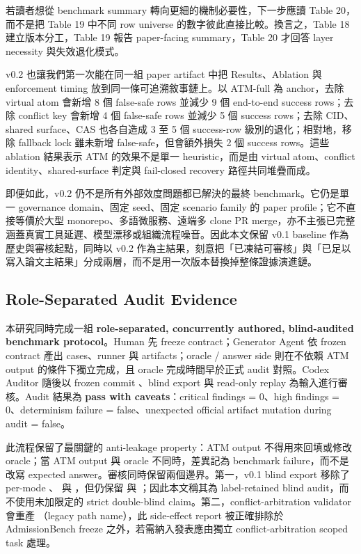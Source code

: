 \documentclass[a4paper,fontset=none]{ctexart}
\begin{document}
若讀者想從 benchmark summary 轉向更細的機制必要性，下一步應讀 Table 20，而不是把 Table 19 中不同 row universe 的數字彼此直接比較。換言之，Table 18 建立版本分工，Table 19 報告 paper-facing summary，Table 20 才回答 layer necessity 與失效退化模式。

v0.2 也讓我們第一次能在同一組 paper artifact 中把 Results、Ablation 與 enforcement timing 放到同一條可追溯敘事鏈上。以 ATM-full 為 anchor，去除 virtual atom 會新增 8 個 false-safe rows 並減少 9 個 end-to-end success rows；去除 conflict key 會新增 4 個 false-safe rows 並減少 5 個 success rows；去除 CID、shared surface、CAS 也各自造成 3 至 5 個 success-row 級別的退化；相對地，移除 fallback lock 雖未新增 false-safe，但會額外損失 2 個 success rows。這些 ablation 結果表示 ATM 的效果不是單一 heuristic，而是由 virtual atom、conflict identity、shared-surface 判定與 fail-closed recovery 路徑共同堆疊而成。

即便如此，v0.2 仍不是所有外部效度問題都已解決的最終 benchmark。它仍是單一 governance domain、固定 seed、固定 scenario family 的 paper profile；它不直接等價於大型 monorepo、多語微服務、遠端多 clone PR merge，亦不主張已完整涵蓋真實工具延遲、模型漂移或組織流程噪音。因此本文保留 v0.1 baseline 作為歷史與審核起點，同時以 v0.2 作為主結果，刻意把「已凍結可審核」與「已足以寫入論文主結果」分成兩層，而不是用一次版本替換掉整條證據演進鏈。

\subsection{Role-Separated Audit Evidence}

本研究同時完成一組 \textbf{role-separated, concurrently authored, blind-audited benchmark protocol}。Human 先 freeze contract；Generator Agent 依 frozen contract 產出 cases、runner 與 artifacts；oracle / answer side 則在不依賴 ATM output 的條件下獨立完成，且 oracle 完成時間早於正式 audit 對照。Codex Auditor 隨後以 frozen commit \texttt{}、blind export 與 read-only replay 為輸入進行審核。Audit 結果為 \textbf{pass with caveats}：critical findings = 0、high findings = 0、determinism failure = false、unexpected official artifact mutation during audit = false。

此流程保留了最關鍵的 anti-leakage property：ATM output 不得用來回填或修改 oracle；當 ATM output 與 oracle 不同時，差異記為 benchmark failure，而不是改寫 expected answer。審核同時保留兩個邊界。第一，v0.1 blind export 移除了 per-mode \texttt{}、\texttt{} 與 \texttt{}，但仍保留 \texttt{} 與 \texttt{}；因此本文稱其為 label-retained blind audit，而不使用未加限定的 strict double-blind claim。第二，conflict-arbitration validator 會重產 \texttt{}（legacy path name），此 side-effect report 被正確排除於 AdmissionBench freeze 之外，若需納入發表應由獨立 conflict-arbitration scoped task 處理。
\end{document}
